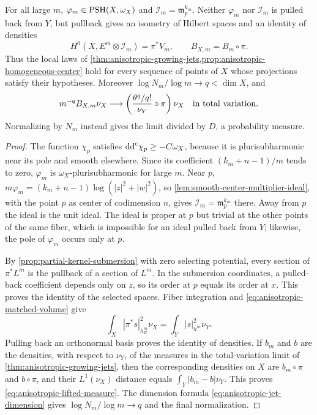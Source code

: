 \begin{theorem}\label{thm:anisotropic-fiber-selector}
For all large $m$, $\varphi_m\in\mathrm{PSH}(X,\omega_X)$ and $\mathcal I_m=\mathfrak m_p^{k_m}$. Neither $\varphi_m$ nor $\mathcal I_m$ is pulled back from $Y$, but pullback gives an isometry of Hilbert spaces and an identity of densities
\[
 H^0(X,E^m\otimes\mathcal I_m)=\pi^*V_m,\qquad
 B_{X,m}=B_m\circ\pi.
\]
Thus the local laws of \cref{thm:anisotropic-growing-jets,prop:anisotropic-homogeneous-center} hold for every sequence of points of $X$ whose projections satisfy their hypotheses. Moreover $\log N_m/\log m\to q<\dim X$, and
\begin{equation}\label{eq:anisotropic-lifted-measure}
 m^{-q}B_{X,m}\nu_X\longrightarrow
 \left(\frac{\theta^q/q!}{\nu_Y}\circ\pi\right)\nu_X
 \quad\hbox{in total variation}.
\end{equation}
Normalizing by $N_m$ instead gives the limit divided by $D$, a probability measure.
\end{theorem}
\begin{proof}
The function $\chi_p$ satisfies $\mathrm{dd}^{\mathrm{c}}\chi_p\geq-C\omega_X$, because it is plurisubharmonic near its pole and smooth elsewhere. Since its coefficient $(k_m+n-1)/m$ tends to zero, $\varphi_m$ is $\omega_X$-plurisubharmonic for large $m$. Near $p$, $m\varphi_m=(k_m+n-1)\log(|z|^2+|w|^2)$, so \cref{lem:smooth-center-multiplier-ideal}, with the point $p$ as center of codimension $n$, gives $\mathcal I_m=\mathfrak m_p^{k_m}$ there. Away from $p$ the ideal is the unit ideal. The ideal is proper at $p$ but trivial at the other points of the same fiber, which is impossible for an ideal pulled back from $Y$; likewise, the pole of $\varphi_m$ occurs only at $p$.

By \cref{prop:partial-kernel-submersion} with zero selecting potential, every section of $\pi^*L^m$ is the pullback of a section of $L^m$. In the submersion coordinates, a pulled-back coefficient depends only on $z$, so its order at $p$ equals its order at $x$. This proves the identity of the selected spaces. Fiber integration and \eqref{eq:anisotropic-matched-volume} give
\[
 \int_X|\pi^*s|_{h_E^m}^2\nu_X=\int_Y|s|_{h^m}^2\nu_Y.
\]
Pulling back an orthonormal basis proves the identity of densities. If $b_m$ and $b$ are the densities, with respect to $\nu_Y$, of the measures in the total-variation limit of \cref{thm:anisotropic-growing-jets}, then the corresponding densities on $X$ are $b_m\circ\pi$ and $b\circ\pi$, and their $L^1(\nu_X)$ distance equals $\int_Y|b_m-b|\nu_Y$. This proves \eqref{eq:anisotropic-lifted-measure}. The dimension formula \eqref{eq:anisotropic-jet-dimension} gives $\log N_m/\log m\to q$ and the final normalization.
\end{proof}

